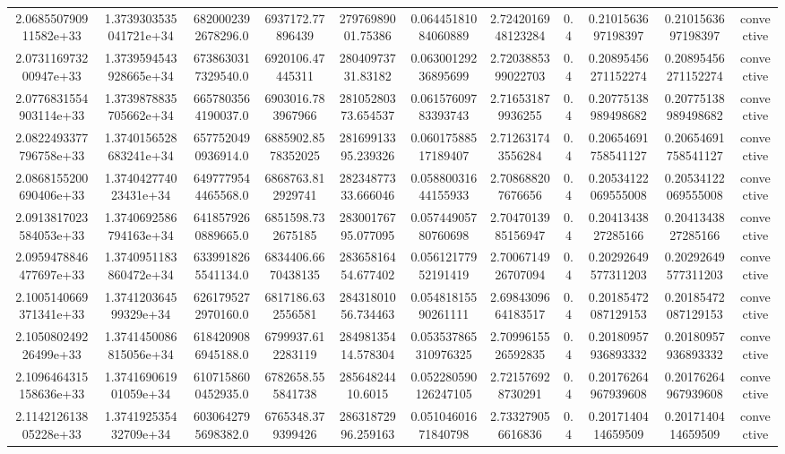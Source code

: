 \begin{table}
\begin{tabular}{ccccccccccc}
2.068550790911582e+33 & 1.3739303535041721e+34 & 6820002392678296.0 & 6937172.77896439 & 27976989001.75386 & 0.06445181084060889 & 2.7242016948123284 & 0.4 & 0.2101563697198397 & 0.2101563697198397 & convective \\
2.073116973200947e+33 & 1.3739594543928665e+34 & 6738630317329540.0 & 6920106.47445311 & 28040973731.83182 & 0.06300129236895699 & 2.7203885399022703 & 0.4 & 0.20895456271152274 & 0.20895456271152274 & convective \\
2.0776831554903114e+33 & 1.3739878835705662e+34 & 6657803564190037.0 & 6903016.783967966 & 28105280373.654537 & 0.06157609783393743 & 2.716531879936255 & 0.4 & 0.20775138989498682 & 0.20775138989498682 & convective \\
2.0822493377796758e+33 & 1.3740156528683241e+34 & 6577520490936914.0 & 6885902.8578352025 & 28169913395.239326 & 0.06017588517189407 & 2.712631743556284 & 0.4 & 0.20654691758541127 & 0.20654691758541127 & convective \\
2.0868155200690406e+33 & 1.374042774023431e+34 & 6497779544465568.0 & 6868763.812929741 & 28234877333.666046 & 0.05880031644155933 & 2.708688207676656 & 0.4 & 0.20534122069555008 & 0.20534122069555008 & convective \\
2.0913817023584053e+33 & 1.3740692586794163e+34 & 6418579260889665.0 & 6851598.732675185 & 28300176795.077095 & 0.05744905780760698 & 2.7047013985156947 & 0.4 & 0.2041343827285166 & 0.2041343827285166 & convective \\
2.0959478846477697e+33 & 1.3740951183860472e+34 & 6339918265541134.0 & 6834406.6670438135 & 28365816454.677402 & 0.05612177952191419 & 2.7006714926707094 & 0.4 & 0.20292649577311203 & 0.20292649577311203 & convective \\
2.1005140669371341e+33 & 1.374120364599329e+34 & 6261795272970160.0 & 6817186.632556581 & 28431801056.734463 & 0.05481815590261111 & 2.6984309664183517 & 0.4 & 0.20185472087129153 & 0.20185472087129153 & convective \\
2.105080249226499e+33 & 1.3741450086815056e+34 & 6184209086945188.0 & 6799937.612283119 & 28498135414.578304 & 0.053537865310976325 & 2.7099615526592835 & 0.4 & 0.20180957936893332 & 0.20180957936893332 & convective \\
2.1096464315158636e+33 & 1.374169061901059e+34 & 6107158600452935.0 & 6782658.555841738 & 28564824410.6015 & 0.052280590126247105 & 2.721576928730291 & 0.4 & 0.20176264967939608 & 0.20176264967939608 & convective \\
2.114212613805228e+33 & 1.374192535432709e+34 & 6030642795698382.0 & 6765348.379399426 & 28631872996.259163 & 0.05104601671840798 & 2.733279056616836 & 0.4 & 0.2017140414659509 & 0.2017140414659509 & convective \\

\end{tabular}
\end{table}
